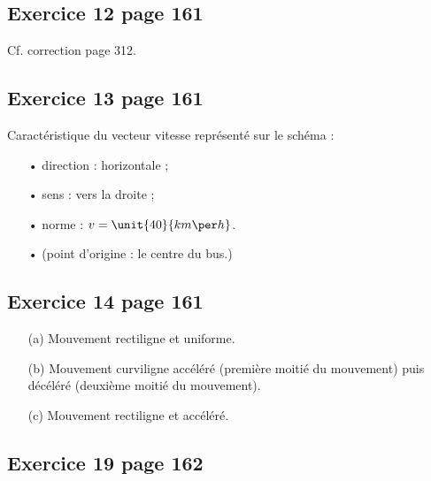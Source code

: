 \documentclass[12pt,a4paper,fleqn]{article}
\begin{document}
\subsection*{Exercice 12 page 161}

Cf. correction page 312.

\subsection*{Exercice 13 page 161}

Caractéristique du vecteur vitesse représenté sur le schéma :
\begin{itemize}
\item[•] direction : horizontale ;
\item[•] sens : vers la droite ;
\item[•] norme : $v = \unit{40}{km\per h}$.
\item[•] (point d'origine : le centre du bus.)
\end{itemize}

\subsection*{Exercice 14 page 161}

\begin{itemize}
\item[(a)] Mouvement rectiligne et uniforme.
\item[(b)] Mouvement curviligne accéléré (première moitié du mouvement) puis décéléré (deuxième moitié du mouvement).
\item[(c)] Mouvement rectiligne et accéléré.
\end{itemize}

\subsection*{Exercice 19 page 162}
\end{document}
